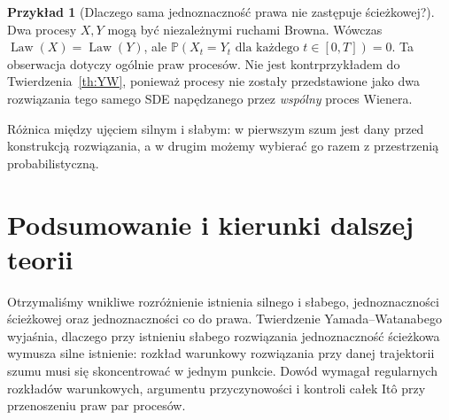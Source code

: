 \documentclass[11pt,a4paper,oneside]{report}
\numberwithin{equation}{chapter}
\theoremstyle{plain}
\theoremstyle{definition}
\newtheorem{przyklad}{Przykład}[chapter]
\theoremstyle{remark}
\newcommand{\Prob}{\mathbb{P}}
\newcommand{\Law}{\operatorname{Law}}
\begin{document}
\begin{przyklad}[Dlaczego sama jednoznaczność prawa nie zastępuje ścieżkowej?]
Dwa procesy $X,Y$ mogą być niezależnymi ruchami Browna.
Wówczas $\Law(X)=\Law(Y)$, ale
$\Prob(X_t=Y_t\text{ dla każdego }t\in[0,T])=0$.
Ta obserwacja dotyczy ogólnie praw procesów. Nie jest
kontrprzykładem do Twierdzenia~\ref{th:YW}, ponieważ
procesy nie zostały przedstawione jako dwa rozwiązania
tego samego SDE napędzanego przez \emph{wspólny} proces
Wienera.
\end{przyklad}

\begin{center}
\par\smallskip\small
Różnica między ujęciem silnym i słabym: w pierwszym
szum jest dany przed konstrukcją rozwiązania, a w drugim
możemy wybierać go razem z przestrzenią probabilistyczną.
\end{center}

\section{Podsumowanie i kierunki dalszej teorii}\label{sec:volIII:14:06}

Otrzymaliśmy wnikliwe rozróżnienie istnienia silnego i słabego,
jednoznaczności ścieżkowej oraz jednoznaczności co do prawa.
Twierdzenie Yamada--Watanabego wyjaśnia, dlaczego przy
istnieniu słabego rozwiązania jednoznaczność ścieżkowa
wymusza silne istnienie: rozkład warunkowy rozwiązania
przy danej trajektorii szumu musi się skoncentrować w jednym
punkcie. Dowód wymagał regularnych rozkładów warunkowych,
argumentu przyczynowości i kontroli całek Itô przy
przenoszeniu praw par procesów.
\end{document}
